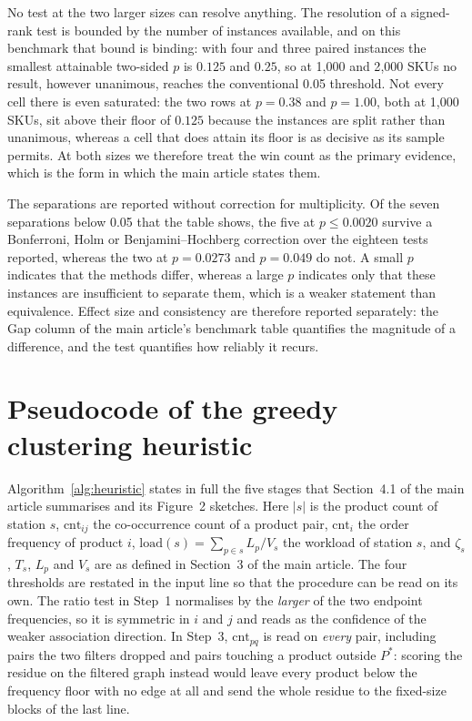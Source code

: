 \documentclass[11pt]{article}
\begin{document}
No test at the two larger sizes can resolve anything. The resolution of a signed-rank test is
bounded by the number of instances available, and on this benchmark that bound is binding: with
four and three paired instances the smallest attainable two-sided $p$ is $0.125$ and $0.25$, so
at 1{,}000 and 2{,}000 SKUs no result, however unanimous, reaches the conventional 0.05
threshold. Not every cell there is even saturated: the two rows at $p=0.38$ and $p=1.00$, both
at 1{,}000 SKUs, sit above their floor of $0.125$ because the instances are split rather than
unanimous, whereas a cell that does attain its floor is as decisive as its sample permits. At
both sizes we therefore treat the win count as the primary evidence, which is the form in which
the main article states them.

The separations are reported without correction for multiplicity. Of the seven separations
below 0.05 that the table shows, the five at $p \le 0.0020$ survive a Bonferroni, Holm or
Benjamini--Hochberg correction over the eighteen tests reported, whereas the two at
$p = 0.0273$ and $p = 0.049$ do not. A small $p$ indicates that the methods differ, whereas a
large $p$ indicates only that these instances are insufficient to separate them, which is a
weaker statement than equivalence. Effect size and consistency are therefore reported
separately: the Gap column of the main article's benchmark table quantifies the magnitude of a
difference, and the test quantifies how reliably it recurs.

\section{Pseudocode of the greedy clustering heuristic}\label{sup:heuristic}
Algorithm~\ref{alg:heuristic} states in full the five stages that Section~4.1 of the main
article summarises and its Figure~2 sketches. Here $|s|$ is the product count of station $s$,
$\mathrm{cnt}_{ij}$ the co-occurrence count of a product pair, $\mathrm{cnt}_i$ the order
frequency of product $i$, $\mathrm{load}(s)=\sum_{p\in s}L_p/V_s$ the workload of station $s$,
and $\zeta_s$, $T_s$, $L_p$ and $V_s$ are as defined in Section~3 of the main article. The four
thresholds are restated in the input line so that the procedure can be read on its own. The
ratio test in Step~1 normalises by the \emph{larger} of the two endpoint frequencies, so it is
symmetric in $i$ and $j$ and reads as the confidence of the weaker association direction. In
Step~3, $\mathrm{cnt}_{pq}$ is read on \emph{every} pair, including pairs the two filters dropped
and pairs touching a product outside $P^{\ast}$: scoring the residue on the filtered graph instead
would leave every product below the frequency floor with no edge at all and send the whole residue
to the fixed-size blocks of the last line.
\end{document}
